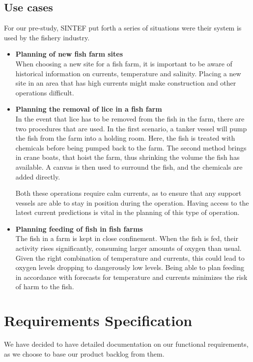 \documentclass[11pt,a4paper,titlepage,oneside]{report}
\begin{document}
  \subsection{Use cases}
	For our \gls{pre-study}, SINTEF put forth a series of situations were their system is used by the fishery industry. 
	\begin{itemize}
		\item \textbf{Planning of new fish farm sites} \\
		When choosing a new site for a fish farm, it is important to be aware of historical information on currents, temperature and salinity. Placing a new site in an area that has high currents might make construction and other operations difficult.
		\item \textbf{Planning the removal of lice in a fish farm} \\
		In the event that lice has to be removed from the fish in the farm, there are two procedures that are used. In the first scenario, a tanker vessel will pump the fish from the farm into a holding room. Here, the fish is treated with chemicals before being pumped back to the farm. The second method brings in crane boats, that hoist the farm, thus shrinking the volume the fish has available. A canvas is then used to surround the fish, and the chemicals are added directly. 

		Both these operations require calm currents, as to ensure that any support vessels are able to stay in position during the operation. Having access to the latest current predictions is vital in the planning of this type of operation.
		\item \textbf{Planning feeding of fish in fish farms} \\
		The fish in a farm is kept in close confinement. When the fish is fed, their activity rises significantly, consuming larger amounts of oxygen than usual. Given the right combination of temperature and currents, this could lead to oxygen levels dropping to dangerously low levels. Being able to plan feeding in accordance with forecasts for temperature and currents minimizes the risk of harm to the fish.
	\end{itemize}

\section{Requirements Specification}
\label{reqspec}
We have decided to have detailed documentation on our functional requirements, as we choose to base our product backlog from them.
\end{document}
